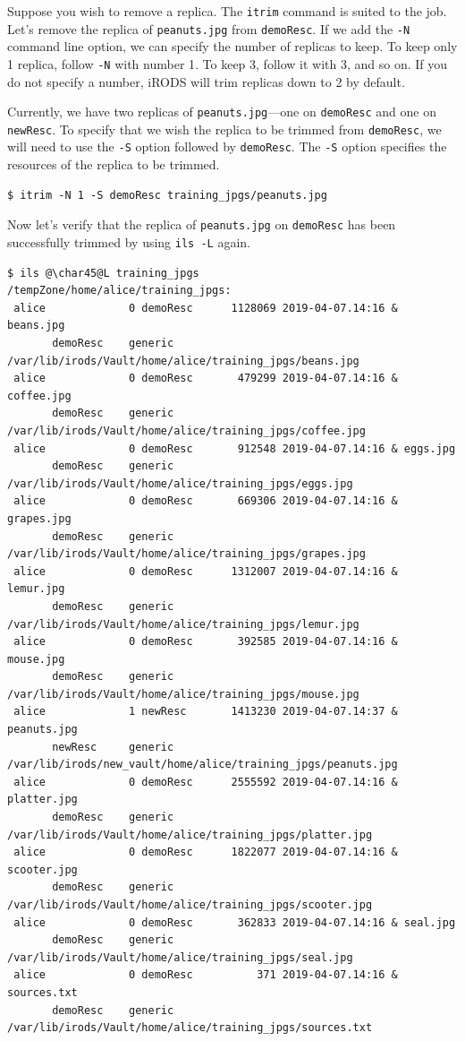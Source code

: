 \documentclass[10pt,oneside]{memoir}
\begin{document}
Suppose you wish to remove a replica. The \texttt{itrim} command is suited to the job. Let's remove the replica of \texttt{peanuts.jpg} from \texttt{demoResc}. If we add the \texttt{-N} command line option, we can specify the number of replicas to keep. To keep only 1 replica, follow \texttt{-N} with number 1. To keep 3, follow it with 3, and so on. If you do not specify a number, iRODS will trim replicas down to 2 by default.


Currently, we have two replicas of \texttt{peanuts.jpg}---one on \texttt{demoResc} and one on \texttt{newResc}. To specify that we wish the replica to be trimmed from \texttt{demoResc}, we will need to use the \texttt{-S} option followed by \texttt{demoResc}. The \texttt{-S} option specifies the resources of the replica to be trimmed.

\begin{lstlisting}
$ itrim -N 1 -S demoResc training_jpgs/peanuts.jpg
\end{lstlisting}

Now let's verify that the replica of \texttt{peanuts.jpg} on \texttt{demoResc} has been successfully trimmed by using \texttt{ils -L} again.

\begin{lstlisting}[basicstyle=\tiny\ttfamily]
$ ils @\char45@L training_jpgs
/tempZone/home/alice/training_jpgs:
 alice             0 demoResc      1128069 2019-04-07.14:16 & beans.jpg
       demoResc    generic    /var/lib/irods/Vault/home/alice/training_jpgs/beans.jpg
 alice             0 demoResc       479299 2019-04-07.14:16 & coffee.jpg
       demoResc    generic    /var/lib/irods/Vault/home/alice/training_jpgs/coffee.jpg
 alice             0 demoResc       912548 2019-04-07.14:16 & eggs.jpg
       demoResc    generic    /var/lib/irods/Vault/home/alice/training_jpgs/eggs.jpg
 alice             0 demoResc       669306 2019-04-07.14:16 & grapes.jpg
       demoResc    generic    /var/lib/irods/Vault/home/alice/training_jpgs/grapes.jpg
 alice             0 demoResc      1312007 2019-04-07.14:16 & lemur.jpg
       demoResc    generic    /var/lib/irods/Vault/home/alice/training_jpgs/lemur.jpg
 alice             0 demoResc       392585 2019-04-07.14:16 & mouse.jpg
       demoResc    generic    /var/lib/irods/Vault/home/alice/training_jpgs/mouse.jpg
 alice             1 newResc       1413230 2019-04-07.14:37 & peanuts.jpg
       newResc     generic    /var/lib/irods/new_vault/home/alice/training_jpgs/peanuts.jpg
 alice             0 demoResc      2555592 2019-04-07.14:16 & platter.jpg
       demoResc    generic    /var/lib/irods/Vault/home/alice/training_jpgs/platter.jpg
 alice             0 demoResc      1822077 2019-04-07.14:16 & scooter.jpg
       demoResc    generic    /var/lib/irods/Vault/home/alice/training_jpgs/scooter.jpg
 alice             0 demoResc       362833 2019-04-07.14:16 & seal.jpg
       demoResc    generic    /var/lib/irods/Vault/home/alice/training_jpgs/seal.jpg
 alice             0 demoResc          371 2019-04-07.14:16 & sources.txt
       demoResc    generic    /var/lib/irods/Vault/home/alice/training_jpgs/sources.txt
\end{lstlisting}
\end{document}
